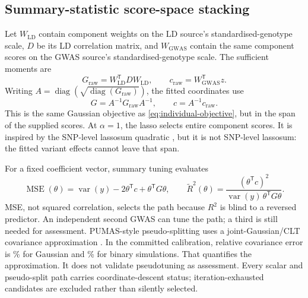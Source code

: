 \documentclass[11pt,a4paper]{article}
\newcommand{\Rtwo}{\(R^2\)}
\begin{document}
\subsection{Summary-statistic score-space stacking}
\label{sec:sumstat}

Let \(W_{\mathrm{LD}}\) contain component weights on the LD
source's standardised-genotype scale, \(D\) be its LD
correlation matrix, and \(W_{\mathrm{GWAS}}\) contain the same
component scores on the GWAS source's standardised-genotype
scale. The sufficient moments are
\begin{equation}
  G_{\mathrm{raw}}=
    W_{\mathrm{LD}}^{\mathsf T} D W_{\mathrm{LD}},
  \qquad
  c_{\mathrm{raw}}=
    W_{\mathrm{GWAS}}^{\mathsf T}z .
  \label{eq:score-moments}
\end{equation}
Writing \(A=\operatorname{diag}
(\sqrt{\operatorname{diag}(G_{\mathrm{raw}})})\), the fitted
coordinates use
\begin{equation}
  G=A^{-1}G_{\mathrm{raw}}A^{-1},
  \qquad
  c=A^{-1}c_{\mathrm{raw}} .
  \label{eq:standardized-moments}
\end{equation}
This is the same Gaussian objective as
\eqref{eq:individual-objective}, but in the span of the supplied
scores. At \(\alpha=1\), the lasso selects entire component
scores. It is inspired by the SNP-level lassosum quadratic
\cite{mak2017}, but it is not SNP-level lassosum: the fitted
variant effects cannot leave that span.

For a fixed coefficient vector, summary tuning evaluates
\begin{equation}
  \operatorname{MSE}(\theta)
    =\operatorname{var}(y)-2\theta^{\mathsf T}c
      +\theta^{\mathsf T}G\theta,
  \qquad
  \widetilde R^2(\theta)
    =\frac{(\theta^{\mathsf T}c)^2}
    {\operatorname{var}(y)\,\theta^{\mathsf T}G\theta}.
  \label{eq:summary-metrics}
\end{equation}
MSE, not squared correlation, selects the path because \Rtwo{}
is blind to a reversed predictor. An independent second GWAS can
tune the path; a third is still needed for assessment.
PUMAS-style pseudo-splitting uses a joint-Gaussian/CLT
covariance approximation \cite{zhao2021}. In the committed
calibration, relative covariance error is
\ReportPumasGaussianErrorPct\% for Gaussian and
\ReportPumasBinaryErrorPct\% for binary simulations. That
quantifies the approximation. It does not validate
pseudotuning as assessment. Every scalar and pseudo-split path
carries coordinate-descent status; iteration-exhausted
candidates are excluded rather than silently selected.
\end{document}
